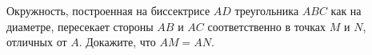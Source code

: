 \begin{ex}
	\begin{condition}
		Окружность, построенная на биссектрисе \( AD  \) треугольника \( ABC  \) как на диаметре, пересекает стороны \( AB  \) и \( AC \) соответственно в точках \( M  \) и \( N  \), отличных от \( A \). Докажите, что \( AM = AN  \).
	\end{condition}
\end{ex}